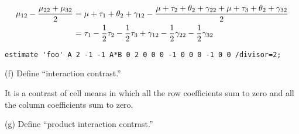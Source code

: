 \begin{align*}
\mu_{12}-{\mu_{22}+\mu_{32}\over2}
&=\mu+\tau_1+\theta_2+\gamma_{12}-
{\mu+\tau_2+\theta_2+\gamma_{22}+\mu+\tau_3+\theta_2+\gamma_{32}
\over2}\\
&=\tau_1-{1\over2}\tau_2-{1\over2}\tau_3+\gamma_{12}
-{1\over2}\gamma_{22}-{1\over2}\gamma_{32}
\end{align*}

\begin{verbatim}
estimate 'foo' A 2 -1 -1 A*B 0 2 0 0 0 -1 0 0 0 -1 0 0 /divisor=2;
\end{verbatim}

\bigskip
\noindent
(f) Define ``interaction contrast.''

\bigskip
\noindent
It is a contrast of cell means in which all the row coefficients
sum to zero and all the column coefficients sum to zero.

\bigskip
\noindent
(g) Define ``product interaction contrast.''



 
